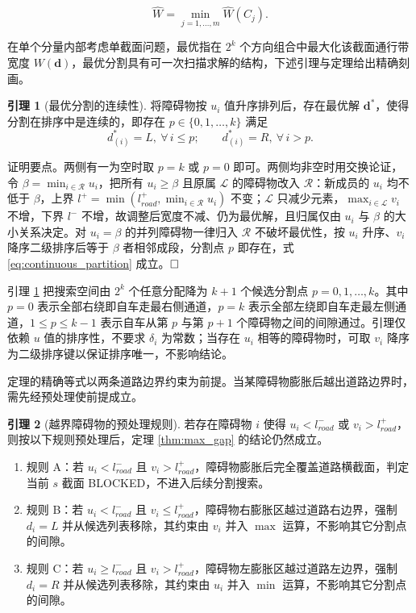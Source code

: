 \documentclass[a4paper,zihao=5]{ctexart}
\theoremstyle{definition}
\newtheorem{lemma}{引理}[section]
\begin{document}
\begin{equation}
    \hat{W} = \min_{j=1,\ldots,m} \hat{W}(C_j).
    \label{eq:global_width}
\end{equation}

在单个分量内部考虑单截面问题，最优指在 $2^k$ 个方向组合中最大化该截面通行带宽度 $W(\mathbf{d})$，最优分割具有可一次扫描求解的结构，下述引理与定理给出精确刻画。

\begin{lemma}[最优分割的连续性]
\label{lem:continuous_partition}
将障碍物按 $u_i$ 值升序排列后，存在最优解 $\mathbf{d}^{*}$，使得分割在排序中是连续的，即存在 $p \in \{0, 1, \ldots, k\}$ 满足
\begin{equation}
    d_{(i)}^{*} = L,\ \forall\, i \leq p; \qquad d_{(i)}^{*} = R,\ \forall\, i > p.
    \label{eq:continuous_partition}
\end{equation}
\end{lemma}

证明要点。两侧有一为空时取 $p=k$ 或 $p=0$ 即可。两侧均非空时用交换论证，令 $\beta = \min_{i \in \mathcal{R}} u_i$，把所有 $u_i \geq \beta$ 且原属 $\mathcal{L}$ 的障碍物改入 $\mathcal{R}$：新成员的 $u_i$ 均不低于 $\beta$，上界 $l^{+} = \min(l_{road}^{+}, \min_{i\in\mathcal{R}} u_i)$ 不变；$\mathcal{L}$ 只减少元素，$\max_{i \in \mathcal{L}} v_i$ 不增，下界 $l^{-}$ 不增，故调整后宽度不减、仍为最优解，且归属仅由 $u_i$ 与 $\beta$ 的大小关系决定。对 $u_i = \beta$ 的并列障碍物一律归入 $\mathcal{R}$ 不破坏最优性，按 $u_i$ 升序、$v_i$ 降序二级排序后等于 $\beta$ 者相邻成段，分割点 $p$ 即存在，式 \eqref{eq:continuous_partition} 成立。$\hfill\Box$

引理 \ref{lem:continuous_partition} 把搜索空间由 $2^k$ 个任意分配降为 $k+1$ 个候选分割点 $p = 0, 1, \ldots, k$。其中 $p=0$ 表示全部右绕即自车走最右侧通道，$p=k$ 表示全部左绕即自车走最左侧通道，$1 \leq p \leq k-1$ 表示自车从第 $p$ 与第 $p+1$ 个障碍物之间的间隙通过。引理仅依赖 $u$ 值的排序性，不要求 $\delta_i$ 为常数；当存在 $u_i$ 相等的障碍物时，可取 $v_i$ 降序为二级排序键以保证排序唯一，不影响结论。

定理的精确等式以两条道路边界约束为前提。当某障碍物膨胀后越出道路边界时，需先经预处理使前提成立。

\begin{lemma}[越界障碍物的预处理规则]
\label{lem:boundary_trim}
若存在障碍物 $i$ 使得 $u_i < l_{road}^{-}$ 或 $v_i > l_{road}^{+}$，则按以下规则预处理后，定理 \ref{thm:max_gap} 的结论仍然成立。
\begin{enumerate}
    \item 规则 A：若 $u_i < l_{road}^{-}$ 且 $v_i > l_{road}^{+}$，障碍物膨胀后完全覆盖道路横截面，判定当前 $s$ 截面 BLOCKED，不进入后续分割搜索。
    \item 规则 B：若 $u_i < l_{road}^{-}$ 且 $v_i \leq l_{road}^{+}$，障碍物右膨胀区越过道路右边界，强制 $d_i = L$ 并从候选列表移除，其约束由 $v_i$ 并入 $\max$ 运算，不影响其它分割点的间隙。
    \item 规则 C：若 $u_i \geq l_{road}^{-}$ 且 $v_i > l_{road}^{+}$，障碍物左膨胀区越过道路左边界，强制 $d_i = R$ 并从候选列表移除，其约束由 $u_i$ 并入 $\min$ 运算，不影响其它分割点的间隙。
\end{enumerate}
\end{lemma}
\end{document}
